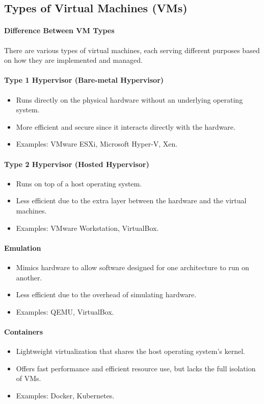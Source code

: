 \documentclass{article}
\begin{document}
\subsection{Types of Virtual Machines (VMs)}

\paragraph{Difference Between VM Types}
There are various types of virtual machines, each serving different purposes based on how they are implemented and managed.

\paragraph{Type 1 Hypervisor (Bare-metal Hypervisor)}
\begin{itemize}
    \item Runs directly on the physical hardware without an underlying operating system.
    \item More efficient and secure since it interacts directly with the hardware.
    \item Examples: VMware ESXi, Microsoft Hyper-V, Xen.
\end{itemize}

\paragraph{Type 2 Hypervisor (Hosted Hypervisor)}
\begin{itemize}
    \item Runs on top of a host operating system.
    \item Less efficient due to the extra layer between the hardware and the virtual machines.
    \item Examples: VMware Workstation, VirtualBox.
\end{itemize}

\paragraph{Emulation}
\begin{itemize}
    \item Mimics hardware to allow software designed for one architecture to run on another.
    \item Less efficient due to the overhead of simulating hardware.
    \item Examples: QEMU, VirtualBox.
\end{itemize}

\paragraph{Containers}
\begin{itemize}
    \item Lightweight virtualization that shares the host operating system's kernel.
    \item Offers fast performance and efficient resource use, but lacks the full isolation of VMs.
    \item Examples: Docker, Kubernetes.
\end{itemize}
\end{document}
